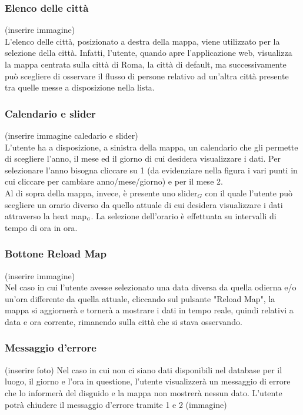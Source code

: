 \subsubsection{Elenco delle città} \label{UtilizzoDiGDPGatheringDetecionPlatformContenutoCentralePaginaInizialeHomeMenùATendina}
(inserire immagine) \\
L'elenco delle città, posizionato a destra della mappa, viene utilizzato per la selezione della città. Infatti, l'utente, quando apre l'applicazione web, visualizza la mappa centrata sulla città di Roma, la città di default, ma successivamente può scegliere di osservare il flusso di persone relativo ad un'altra città presente tra quelle messe a disposizione nella lista. 

\subsubsection{Calendario e slider}\label{UtilizzoDiGDPGatheringDetecionPlatformContenutoCentralePaginaInizialeHomeCalendarioESlider}
(inserire immagine caledario e slider) \\
L'utente ha a disposizione, a sinistra della mappa, un calendario che gli permette di scegliere l'anno, il mese ed il giorno di cui desidera visualizzare i dati. Per selezionare l'anno bisogna cliccare su 1 (da evidenziare nella figura i vari punti in cui cliccare per cambiare anno/mese/giorno) e per il mese 2.
\\
Al di sopra della mappa, invece, è presente uno slider$_G$ con il quale l'utente può scegliere un orario diverso da quello attuale di cui desidera visualizzare i dati attraverso la heat map$_{\scaleto{G}{3pt}}$. La selezione dell'orario è effettuata su intervalli di tempo di ora in ora. 

\subsubsection{Bottone Reload Map} \label{UtilizzoDiGDPGatheringDetecionPlatformContenutoCentralePaginaInizialeHomeBottoneReloadMap}
(inserire immagine)\\
Nel caso in cui l'utente avesse selezionato una data diversa da quella odierna e/o un'ora differente da quella attuale, cliccando sul pulsante "Reload Map", la mappa si aggiornerà e tornerà a mostrare i dati in tempo reale, quindi relativi a data e ora corrente, rimanendo sulla città che si stava osservando. 
\subsubsection{Messaggio d'errore} \label{UtilizzoDiGDPGatheringDetecionPlatformContenutoCentralePaginaInizialeHomeMessaggioDiErrore}
(inserire foto)
Nel caso in cui non ci siano dati disponibili nel database per il luogo, il giorno e l'ora in questione, l'utente visualizzerà un messaggio di errore che lo informerà del disguido e la mappa non mostrerà nessun dato. L'utente potrà chiudere il messaggio d'errore tramite 1 e 2 (immagine)
